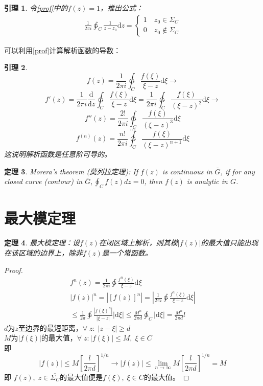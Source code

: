\documentclass[10pt, a4paper, oneside]{ctexbook}
\newtheorem{theorem}{定理}[section]
\newtheorem{lemma}[theorem]{引理}
\def\D{\mathrm{d}}
\newcommand{\F}[1][z]
{\ensuremath{f(#1)}}
\newcommand{\dev}[3][]
{\ensuremath{\frac{\displaystyle \D^{#1} #2}{ \displaystyle \D #3}}}
\begin{document}
\begin{lemma}
    令\ref{prof}中的$\F=1$，推出公式：
    \begin{align*}
        \frac{1}{2\pi i}\ointctrclockwise_C \frac{1}{z-z_0} \D z=
        \begin{cases}
            1\quad z_0\in \Sigma_C\\
            0\quad z_0\notin \Sigma_C
        \end{cases}
    \end{align*}
\end{lemma}
可以利用\ref{prof}计算解析函数的导数：
\begin{lemma}
    \label{method283}
    $$
    \F = \frac{1}{2\pi i}\ointctrclockwise_C \frac{\F[\xi]}{\xi-z}\D \xi \to
    $$
    $$
    f'(z)=\frac{1}{2\pi i} \dev{}{z}\ointctrclockwise_C \frac{\F[\xi]}{\xi - z}\D \xi= \frac{1}{2\pi i}\ointctrclockwise_C \frac{\F[\xi]}{(\xi-z)^2}\D \xi \to
    $$
    $$
    f''(z)=\frac{2!}{2\pi i}\ointctrclockwise_C \frac{\F[\xi]}{(\xi-z)^3}\D \xi 
    $$
    $$\dots$$
    $$
    f^{(n)}(z)=\frac{n!}{2\pi i}\ointctrclockwise_C \frac{\F[\xi]}{(\xi-z)^{n+1}}\D \xi
    $$
    这说明解析函数是任意阶可导的。
\end{lemma}
\begin{theorem}
    \rm
    Morera's theorem (莫列拉定理): If $f(z)$ is continuous in $\bar{G}$, if for any closed curve (contour) in $\displaystyle \bar{G}, \oint_{C} f(z) d z=0$, then $f(z)$ is analytic in $G$.
\end{theorem}

\section{最大模定理}
\begin{theorem}
    最大模定理：设$\F$在闭区域上解析，则其模$|\F|$的最大值只能出现在该区域的边界上，除非$\F$是一个常函数。
\end{theorem}
\begin{proof}
    \begin{align*}
        f^n(z)=\frac{1}{2\pi i} \ointctrclockwise \frac{f^n(\xi)}{\xi-z}\D \xi\\
        |\F|^n=|\left[\F\right]^n|=\left|\frac{1}{2\pi i} \ointctrclockwise \frac{f^n(\xi)}{\xi-z}\D \xi\right| \\ \le \frac{1}{2\pi} \ointctrclockwise \frac{|f(\xi)^n|}{|\xi-z|}|\D \xi|
        \le \frac{M^n}{2\pi d}\ointctrclockwise_C |\D \xi|=\frac{M^n}{2\pi d}l
    \end{align*}
    $d$为$z$至边界的最短距离，$\forall\; z:\;|z-\xi|\ge d$\\
    $M$为$|\F[\xi]|$的最大值，$\forall\; z:|f(\xi)|\le M,\;\xi\in C$\\
    即
    $$
    |\F|\le M\left[\frac{l}{2\pi d}\right]^{1/n}\to|\F|\le \lim_{n\to \infty} M\left[\frac{l}{2\pi d}\right]^{1/n}=M
    $$
    即
    $f(z),\;z\in \overline{\Sigma_C}$的最大值便是$f(\xi),\;\xi\in C$的最大值。
\end{proof}
\end{document}
